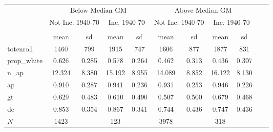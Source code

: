 \begin{tabular}{l*{10}{c}} \toprule
&\multicolumn{4}{c}{Below Median GM}&\multicolumn{4}{c}{Above Median GM} \\ \cmidrule(lr){1-4}  \cmidrule(lr){5-9}
&\multicolumn{2}{c}{Not Inc. 1940-70}&\multicolumn{2}{c}{Inc. 1940-70}&\multicolumn{2}{c}{Not Inc. 1940-70}&\multicolumn{2}{c}{Inc. 1940-70} \\\cmidrule(lr){2-3}  \cmidrule(lr){4-5}  \cmidrule(lr){6-7}  \cmidrule(lr){8-9} 
            &\multicolumn{2}{c}{}     &\multicolumn{2}{c}{}     &\multicolumn{2}{c}{}     &\multicolumn{2}{c}{}     \\
            &        mean&          sd&        mean&          sd&        mean&          sd&        mean&          sd\\
\midrule
totenroll   &        1460&         799&        1915&         747&        1606&         877&        1877&         831\\
prop\_white  &       0.626&       0.285&       0.578&       0.264&       0.462&       0.313&       0.436&       0.307\\
n\_ap        &      12.324&       8.380&      15.192&       8.955&      14.089&       8.852&      16.122&       8.130\\
ap          &       0.910&       0.287&       0.941&       0.236&       0.931&       0.253&       0.946&       0.226\\
gt          &       0.629&       0.483&       0.610&       0.490&       0.507&       0.500&       0.679&       0.468\\
de          &       0.853&       0.354&       0.867&       0.341&       0.744&       0.436&       0.747&       0.436\\
\midrule
\(N\)       &        1423&            &         123&            &        3978&            &         318&            \\
\midrule \bottomrule \end{tabular}
